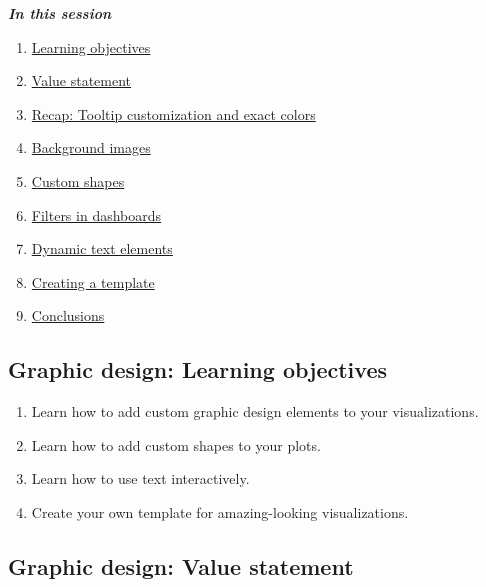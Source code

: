 \documentclass[
]{book}
\providecommand{\tightlist}{%
  \setlength{\itemsep}{0pt}\setlength{\parskip}{0pt}}
\begin{document}
\textbf{\emph{In this session }}

\begin{enumerate}
\def\labelenumi{\arabic{enumi}.}
\tightlist
\item
  \protect\hyperlink{graphic-design-learning-objectives}{Learning objectives}
\item
  \protect\hyperlink{graphic-design-value-statement}{Value statement}
\item
  \protect\hyperlink{recap-tooltip-customization-and-exact-colors}{Recap: Tooltip customization and exact colors}
\item
  \protect\hyperlink{background-images}{Background images}
\item
  \protect\hyperlink{custom-shapes}{Custom shapes}
\item
  \protect\hyperlink{filters-in-dashboards}{Filters in dashboards}
\item
  \protect\hyperlink{dynamic-text-elements}{Dynamic text elements}
\item
  \protect\hyperlink{creating-a-template}{Creating a template}
\item
  \protect\hyperlink{graphic-design-conclusions}{Conclusions}
\end{enumerate}

\hypertarget{graphic-design-learning-objectives}{%
\subsection{Graphic design: Learning objectives}\label{graphic-design-learning-objectives}}

\begin{enumerate}
\def\labelenumi{\arabic{enumi}.}
\tightlist
\item
  Learn how to add custom graphic design elements to your visualizations.
\item
  Learn how to add custom shapes to your plots.
\item
  Learn how to use text interactively.
\item
  Create your own template for amazing-looking visualizations.
\end{enumerate}

\hypertarget{graphic-design-value-statement}{%
\subsection{Graphic design: Value statement}\label{graphic-design-value-statement}}
\end{document}
